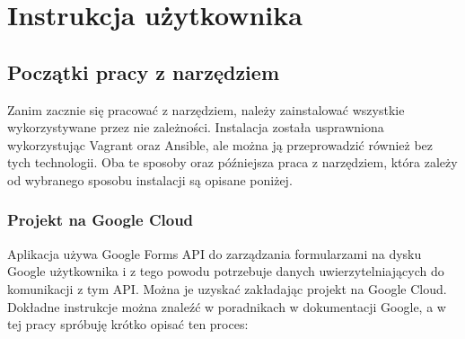 \chapter{Instrukcja użytkownika}
\section{Początki pracy  z narzędziem}
Zanim zacznie się pracować z narzędziem, należy zainstalować
wszystkie wykorzystywane przez nie zależności. Instalacja została 
usprawniona wykorzystując Vagrant oraz Ansible, ale można ją przeprowadzić
również bez tych technologii. Oba te sposoby oraz późniejsza praca z narzędziem,
która zależy od wybranego sposobu instalacji są opisane poniżej.

\subsection{Projekt na Google Cloud}
Aplikacja używa Google Forms API do zarządzania formularzami na dysku Google
użytkownika i z tego powodu potrzebuje danych uwierzytelniających do 
komunikacji z tym API. Można je uzyskać zakładając projekt na Google Cloud.
Dokładne instrukcje można znaleźć w poradnikach w dokumentacji Google, 
a w tej pracy spróbuję krótko opisać ten proces: 

